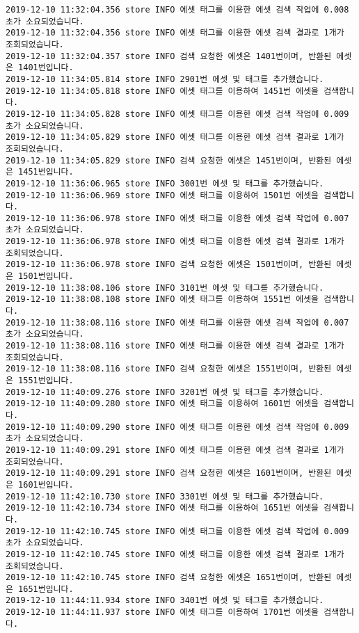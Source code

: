\begin{Verbatim}[fontsize=\tiny, breaklines=true, breakanywhere=true]
2019-12-10 11:32:04.356 store INFO 에셋 태그를 이용한 에셋 검색 작업에 0.008초가 소요되었습니다.
2019-12-10 11:32:04.356 store INFO 에셋 태그를 이용한 에셋 검색 결과로 1개가 조회되었습니다.
2019-12-10 11:32:04.357 store INFO 검색 요청한 에셋은 1401번이며, 반환된 에셋은 1401번입니다.
2019-12-10 11:34:05.814 store INFO 2901번 에셋 및 태그를 추가했습니다.
2019-12-10 11:34:05.818 store INFO 에셋 태그를 이용하여 1451번 에셋을 검색합니다.
2019-12-10 11:34:05.828 store INFO 에셋 태그를 이용한 에셋 검색 작업에 0.009초가 소요되었습니다.
2019-12-10 11:34:05.829 store INFO 에셋 태그를 이용한 에셋 검색 결과로 1개가 조회되었습니다.
2019-12-10 11:34:05.829 store INFO 검색 요청한 에셋은 1451번이며, 반환된 에셋은 1451번입니다.
2019-12-10 11:36:06.965 store INFO 3001번 에셋 및 태그를 추가했습니다.
2019-12-10 11:36:06.969 store INFO 에셋 태그를 이용하여 1501번 에셋을 검색합니다.
2019-12-10 11:36:06.978 store INFO 에셋 태그를 이용한 에셋 검색 작업에 0.007초가 소요되었습니다.
2019-12-10 11:36:06.978 store INFO 에셋 태그를 이용한 에셋 검색 결과로 1개가 조회되었습니다.
2019-12-10 11:36:06.978 store INFO 검색 요청한 에셋은 1501번이며, 반환된 에셋은 1501번입니다.
2019-12-10 11:38:08.106 store INFO 3101번 에셋 및 태그를 추가했습니다.
2019-12-10 11:38:08.108 store INFO 에셋 태그를 이용하여 1551번 에셋을 검색합니다.
2019-12-10 11:38:08.116 store INFO 에셋 태그를 이용한 에셋 검색 작업에 0.007초가 소요되었습니다.
2019-12-10 11:38:08.116 store INFO 에셋 태그를 이용한 에셋 검색 결과로 1개가 조회되었습니다.
2019-12-10 11:38:08.116 store INFO 검색 요청한 에셋은 1551번이며, 반환된 에셋은 1551번입니다.
2019-12-10 11:40:09.276 store INFO 3201번 에셋 및 태그를 추가했습니다.
2019-12-10 11:40:09.280 store INFO 에셋 태그를 이용하여 1601번 에셋을 검색합니다.
2019-12-10 11:40:09.290 store INFO 에셋 태그를 이용한 에셋 검색 작업에 0.009초가 소요되었습니다.
2019-12-10 11:40:09.291 store INFO 에셋 태그를 이용한 에셋 검색 결과로 1개가 조회되었습니다.
2019-12-10 11:40:09.291 store INFO 검색 요청한 에셋은 1601번이며, 반환된 에셋은 1601번입니다.
2019-12-10 11:42:10.730 store INFO 3301번 에셋 및 태그를 추가했습니다.
2019-12-10 11:42:10.734 store INFO 에셋 태그를 이용하여 1651번 에셋을 검색합니다.
2019-12-10 11:42:10.745 store INFO 에셋 태그를 이용한 에셋 검색 작업에 0.009초가 소요되었습니다.
2019-12-10 11:42:10.745 store INFO 에셋 태그를 이용한 에셋 검색 결과로 1개가 조회되었습니다.
2019-12-10 11:42:10.745 store INFO 검색 요청한 에셋은 1651번이며, 반환된 에셋은 1651번입니다.
2019-12-10 11:44:11.934 store INFO 3401번 에셋 및 태그를 추가했습니다.
2019-12-10 11:44:11.937 store INFO 에셋 태그를 이용하여 1701번 에셋을 검색합니다.

\end{Verbatim}
